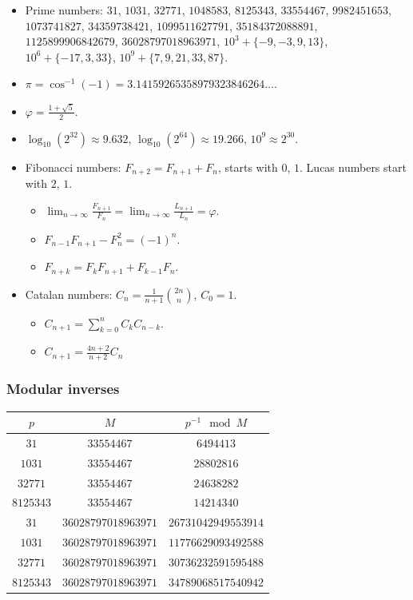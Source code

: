 \begin{itemize}
    \item Prime numbers: $31$, $1031$, $32771$, $1048583$, $8125343$, $33554467$, $9982451653$, $1073741827$, $34359738421$, $1099511627791$, $35184372088891$, $1125899906842679$, $36028797018963971$, $10^3 + \{-9,-3,9,13\}$, $10^6 + \{-17,3,33\}$, $10^9 + \{7,9,21,33,87\}$.
    \item $\pi = \cos^{-1}(-1) = 3.14159265358979323846264\dots$.
    \item $\varphi = \frac{1 + \sqrt5}{2}$.
    \item $\log_{10}(2^{32}) \approx 9.632$, $\log_{10}(2^{64}) \approx 19.266$, $10^9 \approx 2^{30}$.
    \item Fibonacci numbers: $F_{n+2} = F_{n+1} + F_n$, starts with $0$, $1$. Lucas numbers start with $2$, $1$.
    \begin{itemize}
        \item $\lim_{n \to \infty} \frac{F_{n+1}}{F_n} = \lim_{n \to \infty} \frac{L_{n+1}}{L_n} = \varphi$.
        \item $F_{n-1}F_{n+1} - F_n^2 = (-1)^n$.
        \item $F_{n+k} = F_kF_{n+1} + F_{k-1}F_n$.
    \end{itemize}
    \item Catalan numbers: $C_n = \frac1{n + 1}\binom{2n}n$, $C_0 = 1$.
    \begin{itemize}
        \item $C_{n+1} = \sum_{k=0}^n C_kC_{n-k}$.
        \item $C_{n+1} = \frac{4n + 2}{n + 2}C_n$
    \end{itemize}
\end{itemize}

\subsubsection{Modular inverses}
\begin{table}[H]
    \centering
    \begin{tabular}{|c|c|c|}
        \hline
        $p$ & $M$ & $p^{-1} \mod M$ \\
        \hline
        $31$ & $33554467$ & $6494413$ \\
        $1031$ & $33554467$ & $28802816$ \\
        $32771$ & $33554467$ & $24638282$ \\
        $8125343$ & $33554467$ & $14214340$ \\
        $31$ & $36028797018963971$ & $26731042949553914$ \\
        $1031$ & $36028797018963971$ & $11776629093492588$ \\
        $32771$ & $36028797018963971$ & $30736232591595488$ \\
        $8125343$ & $36028797018963971$ & $34789068517540942$ \\
        \hline
    \end{tabular}
    \label{tab:modinv}
\end{table}



